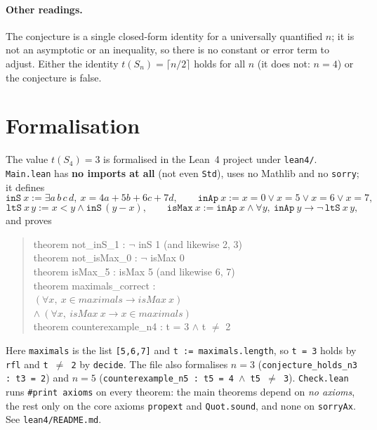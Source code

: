 \documentclass[11pt]{article}
\theoremstyle{definition}
\theoremstyle{remark}
\begin{document}
\paragraph{Other readings.} The conjecture is a single closed-form identity
for a universally quantified $n$; it is not an asymptotic or an inequality, so
there is no constant or error term to adjust. Either the identity
$t(S_n) = \lceil n/2 \rceil$ holds for all $n$ (it does not: $n = 4$) or the
conjecture is false.

\section{Formalisation}\label{sec:lean}

The value $t(S_4) = 3$ is formalised in the Lean~4 project under
\texttt{lean4/}. \texttt{Main.lean} has \textbf{no imports at all} (not even
\texttt{Std}), uses no Mathlib and no \texttt{sorry}; it defines
\[
\texttt{inS}\ x := \exists a\,b\,c\,d,\ x = 4a+5b+6c+7d, \qquad
\texttt{inAp}\ x := x = 0 \lor x = 5 \lor x = 6 \lor x = 7,
\]
\[
\texttt{ltS}\ x\,y := x < y \land \texttt{inS}\,(y-x), \qquad
\texttt{isMax}\ x := \texttt{inAp}\ x \land \forall y,\ \texttt{inAp}\ y \to \neg\,\texttt{ltS}\ x\,y,
\]
and proves
\begin{quote}\ttfamily\small
theorem not\_inS\_1 : \(\neg\) inS 1 \quad (and likewise 2, 3)\\
theorem not\_isMax\_0 : \(\neg\) isMax 0\\
theorem isMax\_5 : isMax 5 \quad (and likewise 6, 7)\\
theorem maximals\_correct :\\
\hspace*{1em}\((\forall x,\ x \in maximals \to isMax\ x)\)\\
\hspace*{1em}\(\wedge\ (\forall x,\ isMax\ x \to x \in maximals)\)\\
theorem counterexample\_n4 : t = 3 \(\wedge\) t \(\ne\) 2
\end{quote}
Here \texttt{maximals} is the list \texttt{[5,6,7]} and
\texttt{t := maximals.length}, so \texttt{t = 3} holds by \texttt{rfl} and
\texttt{t \(\ne\) 2} by \texttt{decide}. The file also formalises $n = 3$
(\texttt{conjecture\_holds\_n3 : t3 = 2}) and $n = 5$
(\texttt{counterexample\_n5 : t5 = 4 \(\wedge\) t5 \(\ne\) 3}).
\texttt{Check.lean} runs \texttt{\#print axioms} on every theorem: the main
theorems depend on \emph{no axioms}, the rest only on the core axioms
\texttt{propext} and \texttt{Quot.sound}, and none on \texttt{sorryAx}. See
\texttt{lean4/README.md}.
\end{document}
